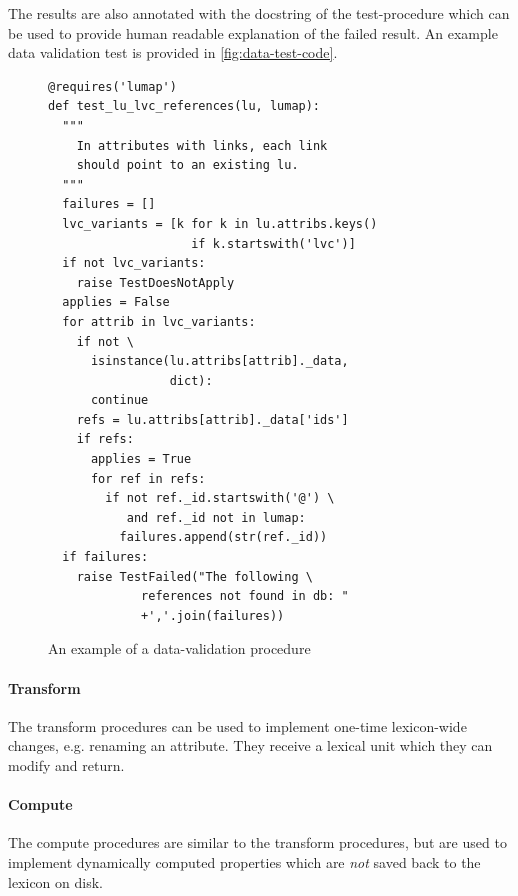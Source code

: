 \documentclass[10pt, a4paper]{article}
\newcommand{\rrr}[1]{{\color{red} REVIEWER: #1}}
\begin{document}
The results are also annotated with the docstring of the test-procedure which can be used to provide human
readable explanation of the failed result. An example data validation test is provided in \autoref{fig:data-test-code}.
\begin{figure}
\small
%
%
%
\begin{verbatim}
@requires('lumap')
def test_lu_lvc_references(lu, lumap):
  """
    In attributes with links, each link
    should point to an existing lu.
  """
  failures = []
  lvc_variants = [k for k in lu.attribs.keys()
                    if k.startswith('lvc')]
  if not lvc_variants:
    raise TestDoesNotApply
  applies = False
  for attrib in lvc_variants:
    if not \
      isinstance(lu.attribs[attrib]._data,
                 dict):
      continue
    refs = lu.attribs[attrib]._data['ids']
    if refs:
      applies = True
      for ref in refs:
        if not ref._id.startswith('@') \
           and ref._id not in lumap:
          failures.append(str(ref._id))
  if failures:
    raise TestFailed("The following \
             references not found in db: "
             +','.join(failures))
\end{verbatim}

\caption{\label{fig:data-test-code}An example of a data-validation procedure}
\end{figure}

\paragraph{Transform} The transform procedures can be used to implement one-time lexicon-wide changes, e.g.
renaming an attribute. They receive a lexical unit which they can modify and return.

\paragraph{Compute}\label{sec:computed} The compute procedures are similar to the transform procedures, but are used to implement dynamically computed properties which are \emph{not} saved back to the lexicon on disk.
\end{document}
